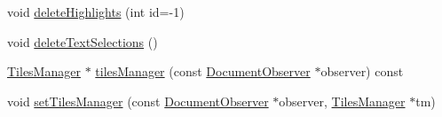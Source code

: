 \begin{DoxyCompactItemize}
void \hyperlink{classOkular_1_1PagePrivate_a27af63923ab99c620fb6437e697dd57a}{delete\+Highlights} (int id=-\/1)
\item 
void \hyperlink{classOkular_1_1PagePrivate_ab500c25ba21b2e1b88d20de10f8acec6}{delete\+Text\+Selections} ()
\item 
\hyperlink{classOkular_1_1TilesManager}{Tiles\+Manager} $\ast$ \hyperlink{classOkular_1_1PagePrivate_a8eec394b8e7492196e204812d82e89c6}{tiles\+Manager} (const \hyperlink{classOkular_1_1DocumentObserver}{Document\+Observer} $\ast$observer) const 
\item 
void \hyperlink{classOkular_1_1PagePrivate_ad1fe37fce8a6217b9a975efcd91e7210}{set\+Tiles\+Manager} (const \hyperlink{classOkular_1_1DocumentObserver}{Document\+Observer} $\ast$observer, \hyperlink{classOkular_1_1TilesManager}{Tiles\+Manager} $\ast$tm)
\end{DoxyCompactItemize}
